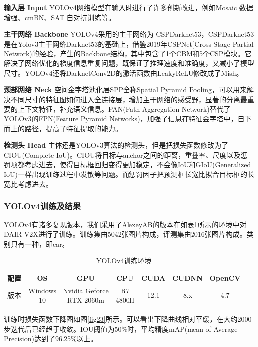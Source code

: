 \textbf{输入层 Input}
YOLOv4网络模型在输入时进行了许多创新改进，例如Mosaic 数据增强、cmBN、SAT 自对抗训练等。

\textbf{主干网络 Backbone} 
YOLOv4采用的主干网络为 CSPDarknet53，CSPDarknet53是在Yolov3主干网络Darknet53的基础上，借鉴2019年CSPNet(Cross Stage Partial Network)的经验，产生的Backbone结构，其中包含了1个CBM和5个CSP模块。它解决了网络优化的梯度信息重复问题，既保证了推理速度和准确度，又减小了模型尺寸。YOLOv4还将DarknetConv2D的激活函数由LeakyReLU修改成了Mish。

\textbf{颈部网络 Neck} 
空间金字塔池化层SPP全称Spatial Pyramid Pooling，可以用来解决不同尺寸的特征图如何进入全连接层，增加主干网络的感受野，显著的分离最重要的上下文特征，补充语义信息。PAN(Path Aggregation Network)替代了YOLOv3的FPN(Feature Pyramid
Networks)，加强了信息在特征金字塔中，自下而上的路径，提高了特征提取的能力。

\textbf{检测头 Head} 主体还是YOLOv3算法的检测头，但是把损失函数修改为了CIOU(Complete IoU)。CIOU将目标与anchor之间的距离，重叠率、尺度以及惩罚项都考虑进去，使得目标框回归变得更加稳定，不会像IoU和GIoU(Generalized IoU)一样出现训练过程中发散等问题。而惩罚因子把预测框长宽比拟合目标框的长宽比考虑进去。

\subsubsection{YOLOv4训练及结果}

YOLOv4有诸多复现版本，我们采用了AlexeyAB的版本在如表\ref{table7}所示的环境中对DAIR-V2X进行了训练。训练集由5042张图片构成，评测集由2016张图片构成。类别只有一种，即car。

\begin{table}[htb]
    \centering
    \caption{YOLOv4训练环境}
    \begin{tabular}{c c c c c c c}
    \toprule
    配置 & OS & GPU & CPU & CUDA & CUDNN & OpenCV \\
    \midrule
    版本 & \makecell{Windows\\10} & \makecell{Nvidia Geforce \\ RTX 2060m} & \makecell{R7\\ 4800H} & 12.1 & 8.x & 4.7\\
    \bottomrule
    \end{tabular}
    \label{table7}
\end{table}

训练时损失函数下降图如图\ref{fig23}所示。可以看出下降曲线相对平缓，在大约2000步迭代后已经趋于收敛。IOU阈值为50\%时，平均精度mAP(mean of Average Precision)达到了96.25\%以上。

